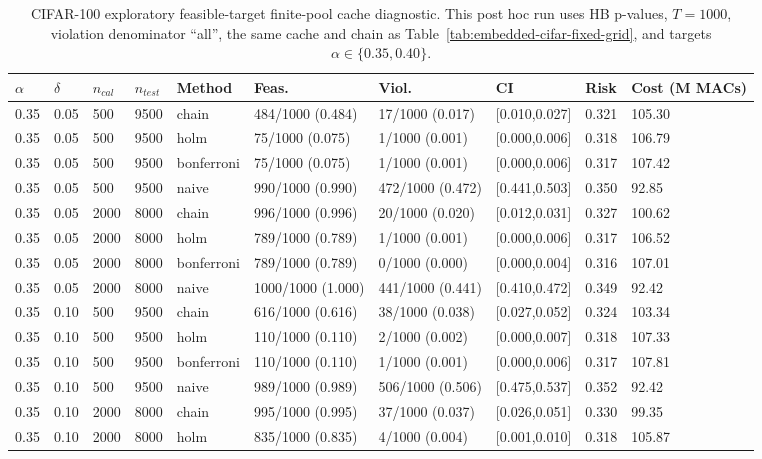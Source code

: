 \documentclass{ieeeaccess}
\begin{document}
\begin{table}[p]
\centering
\caption{CIFAR-100 exploratory feasible-target finite-pool cache diagnostic. This post hoc run uses HB p-values, $T=1000$, violation denominator ``all'', the same cache and chain as Table~\ref{tab:embedded-cifar-fixed-grid}, and targets $\alpha\in\{0.35,0.40\}$.}
\label{tab:embedded-cifar-exploratory}
\begin{tabular}{@{}llllllllll@{}}
\toprule
$\alpha$ & $\delta$ & $n_{cal}$ & $n_{test}$ & Method & Feas. & Viol. & CI & Risk & Cost (M MACs) \\
\midrule
0.35 & 0.05 & 500 & 9500 & chain & 484/1000 (0.484) & 17/1000 (0.017) & [0.010,0.027] & 0.321 & 105.30 \\
0.35 & 0.05 & 500 & 9500 & holm & 75/1000 (0.075) & 1/1000 (0.001) & [0.000,0.006] & 0.318 & 106.79 \\
0.35 & 0.05 & 500 & 9500 & bonferroni & 75/1000 (0.075) & 1/1000 (0.001) & [0.000,0.006] & 0.317 & 107.42 \\
0.35 & 0.05 & 500 & 9500 & naive & 990/1000 (0.990) & 472/1000 (0.472) & [0.441,0.503] & 0.350 & 92.85 \\
0.35 & 0.05 & 2000 & 8000 & chain & 996/1000 (0.996) & 20/1000 (0.020) & [0.012,0.031] & 0.327 & 100.62 \\
0.35 & 0.05 & 2000 & 8000 & holm & 789/1000 (0.789) & 1/1000 (0.001) & [0.000,0.006] & 0.317 & 106.52 \\
0.35 & 0.05 & 2000 & 8000 & bonferroni & 789/1000 (0.789) & 0/1000 (0.000) & [0.000,0.004] & 0.316 & 107.01 \\
0.35 & 0.05 & 2000 & 8000 & naive & 1000/1000 (1.000) & 441/1000 (0.441) & [0.410,0.472] & 0.349 & 92.42 \\
0.35 & 0.10 & 500 & 9500 & chain & 616/1000 (0.616) & 38/1000 (0.038) & [0.027,0.052] & 0.324 & 103.34 \\
0.35 & 0.10 & 500 & 9500 & holm & 110/1000 (0.110) & 2/1000 (0.002) & [0.000,0.007] & 0.318 & 107.33 \\
0.35 & 0.10 & 500 & 9500 & bonferroni & 110/1000 (0.110) & 1/1000 (0.001) & [0.000,0.006] & 0.317 & 107.81 \\
0.35 & 0.10 & 500 & 9500 & naive & 989/1000 (0.989) & 506/1000 (0.506) & [0.475,0.537] & 0.352 & 92.42 \\
0.35 & 0.10 & 2000 & 8000 & chain & 995/1000 (0.995) & 37/1000 (0.037) & [0.026,0.051] & 0.330 & 99.35 \\
0.35 & 0.10 & 2000 & 8000 & holm & 835/1000 (0.835) & 4/1000 (0.004) & [0.001,0.010] & 0.318 & 105.87 \\

\end{tabular}
\end{table}
\end{document}

